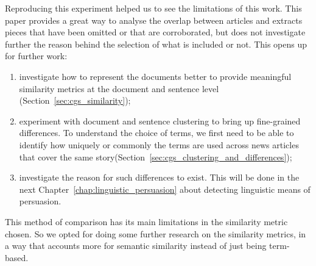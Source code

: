 

Reproducing this experiment helped us to see the limitations of this work. %
This paper provides a great way to analyse the overlap between articles and extracts pieces that have been omitted or that are corroborated, but does not investigate further the reason behind the selection of what is included or not.
This opens up for further work:
\begin{enumerate}
    \item investigate how to represent the documents better to provide meaningful similarity metrics at the document and sentence level (Section~\ref{sec:cgs_similarity}); %
    \item experiment with document and sentence clustering to bring up fine-grained differences. To understand the choice of terms, we first need to be able to identify how uniquely or commonly the terms are used across news articles that cover the same story(Section~\ref{sec:cgs_clustering_and_differences}); %
    \item investigate the reason for such differences to exist. This will be done in the next Chapter~\ref{chap:linguistic_persuasion} about detecting linguistic means of persuasion.
\end{enumerate}

This method of comparison has its main limitations in the similarity metric chosen. So we opted for doing some further research on the similarity metrics, in a way that accounts more for semantic similarity instead of just being term-based.


